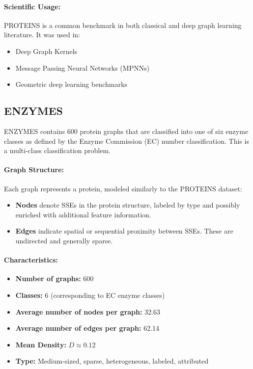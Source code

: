 \documentclass[11pt,a4paper]{article}
\begin{document}
\paragraph{Scientific Usage:}
PROTEINS is a common benchmark in both classical and deep graph learning literature. It was used in:
\begin{itemize}
	\item Deep Graph Kernels \cite{yanardag2015deep}
	\item Message Passing Neural Networks (MPNNs) \cite{morris2020tudataset}
	\item Geometric deep learning benchmarks \cite{dwivedi2020benchmarking}
\end{itemize}

\subsection*{ENZYMES}

ENZYMES contains 600 protein graphs that are classified into one of six enzyme classes as defined by the Enzyme Commission (EC) number classification. This is a multi-class classification problem.

\paragraph{Graph Structure:}
Each graph represents a protein, modeled similarly to the PROTEINS dataset:
\begin{itemize}
	\item \textbf{Nodes} denote SSEs in the protein structure, labeled by type and possibly enriched with additional feature information.
	\item \textbf{Edges} indicate spatial or sequential proximity between SSEs. These are undirected and generally sparse.
\end{itemize}

\paragraph{Characteristics:}
\begin{itemize}
	\item \textbf{Number of graphs:} 600
	\item \textbf{Classes:} 6 (corresponding to EC enzyme classes)
	\item \textbf{Average number of nodes per graph:} 32.63
	\item \textbf{Average number of edges per graph:} 62.14
	\item \textbf{Mean Density:} $D \approx 0.12$
	\item \textbf{Type:} Medium-sized, sparse, heterogeneous, labeled, attributed
\end{itemize}
\end{document}
